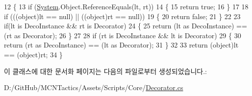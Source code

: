 \begin{DoxyCode}
12         \{
13             \textcolor{keywordflow}{if} (\hyperlink{namespace_system}{System}.Object.ReferenceEquals(lt, rt))
14             \{
15                 \textcolor{keywordflow}{return} \textcolor{keyword}{true};
16             \}
17 
18             \textcolor{keywordflow}{if} (((\textcolor{keywordtype}{object})lt == null) || ((object)rt == null))
19             \{
20                 \textcolor{keywordflow}{return} \textcolor{keyword}{false};
21             \}
22             
23             \textcolor{keywordflow}{if}(lt is DecoInstance && rt is Decorator)
24             \{
25                 \textcolor{keywordflow}{return} (lt as DecoInstance) == (rt as Decorator);
26             \}
27 
28             \textcolor{keywordflow}{if} (rt is DecoInstance && lt is Decorator)
29             \{
30                 \textcolor{keywordflow}{return} (rt as DecoInstance) == (lt as Decorator);
31             \}
32 
33             \textcolor{keywordflow}{return} (\textcolor{keywordtype}{object})lt == (object)rt;
34         \}
\end{DoxyCode}


이 클래스에 대한 문서화 페이지는 다음의 파일로부터 생성되었습니다.\+:\begin{DoxyCompactItemize}
\item 
D\+:/\+Git\+Hub/\+M\+C\+N\+Tactics/\+Assets/\+Scripts/\+Core/\hyperlink{_decorator_8cs}{Decorator.\+cs}\end{DoxyCompactItemize}
